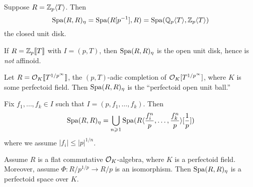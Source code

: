 \begin{example}
Suppose $R=\mathbb{Z}_p\langle T\rangle$. Then 
\[
  \operatorname{Spa}(R,R)_\eta = \operatorname{Spa}(R[p^{-1}],R) = \operatorname{Spa}(\mathbb{Q}_p\langle T\rangle, \mathbb{Z}_p\langle T\rangle) 
\]
the closed unit disk. 
\end{example}

\begin{example}
If $R=\mathbb{Z}_p\llbracket {T} \rrbracket$ with $I=(p,T)$, then $\operatorname{Spa}(R,R)_\eta$ is the open unit disk, 
hence is \emph{not} affinoid. 
\end{example}

\begin{example}
Let $R=\mathcal{O}_K\llbracket {T^{1/p^\infty}} \rrbracket$, the $(p,T)$-adic completion of 
$\mathcal{O}_K[T^{1/p^\infty}]$, where $K$ is some perfectoid field. Then 
$\operatorname{Spa}(R,R)_\eta$ is the ``perfectoid open unit ball.'' 
\end{example}

\begin{proposition}
Fix $f_1,\dots,f_k\in I$ such that $I=(p,f_1,\dots,f_k)$. Then 
\[
  \operatorname{Spa}(R,R)_\eta = \bigcup_{n\geqslant 1} \operatorname{Spa}(R\langle \frac{f_i^n}{p},\dots,\frac{f_k^n}{p}\rangle[\frac 1 p])
\]
where we assume $|f_i|\leqslant |p|^{1/n}$. 
\end{proposition}

\begin{proposition}
Assume $R$ is a flat commutative $\mathcal{O}_K$-algebra, where $K$ is a perfectoid field. 
Moreover, assume $\Phi:R/p^{1/p}\to R/p$ is an isomorphism. Then 
$\operatorname{Spa}(R,R)_\eta$ is a perfectoid space over $K$. 
\end{proposition}

